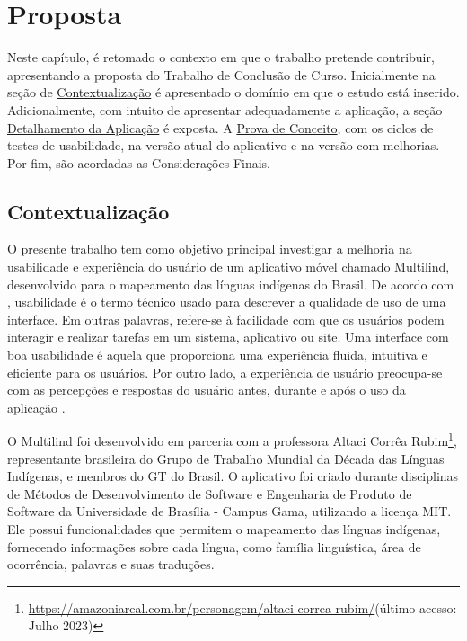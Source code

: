 \chapter[Proposta]{Proposta}
\label{chap:Proposta}
Neste capítulo, é retomado o contexto em que o trabalho pretende contribuir, apresentando a proposta do Trabalho de Conclusão de Curso. Inicialmente na seção de \hyperref[sec:Contextualização]{Contextualização} é 
apresentado o domínio em que o estudo está inserido. Adicionalmente, com intuito de apresentar adequadamente a aplicação, a seção \hyperref[sec:Detalhamento da Aplicacao]{Detalhamento da Aplicação} é exposta. A \hyperref[sec:Prova de Conceito]{Prova de Conceito}, 
com os ciclos de testes de usabilidade, na versão atual do aplicativo e na versão com melhorias. Por fim, são acordadas as Considerações Finais.

\section{Contextualização}
\label{sec:Contextualizacao}
O presente trabalho tem como objetivo principal investigar a melhoria na usabilidade e experiência do usuário de um aplicativo móvel chamado Multilind, desenvolvido para o mapeamento das línguas indígenas do Brasil. 
De acordo com , usabilidade é o termo técnico usado para descrever a qualidade de uso de uma interface. Em outras palavras, refere-se à facilidade com que os usuários podem interagir e realizar 
tarefas em um sistema, aplicativo ou site. Uma interface com boa usabilidade é aquela que proporciona uma experiência fluida, intuitiva e eficiente para os usuários. Por outro lado, a experiência de usuário preocupa-se 
com as percepções e respostas do usuário antes, durante e após o uso da aplicação \cite{iso9241210}.

O Multilind foi desenvolvido em parceria com a professora Altaci Corrêa Rubim\footnote{\url{https://amazoniareal.com.br/personagem/altaci-correa-rubim/}(último acesso: Julho 2023)}, representante brasileira do Grupo de Trabalho Mundial da Década das Línguas Indígenas, 
e membros do GT do Brasil. O aplicativo foi criado durante disciplinas de Métodos de Desenvolvimento de Software e Engenharia de Produto de Software da Universidade de Brasília - Campus Gama, utilizando a licença MIT. Ele possui funcionalidades que permitem o mapeamento 
das línguas indígenas, fornecendo informações sobre cada língua, como família linguística, área de ocorrência, palavras e suas traduções.

